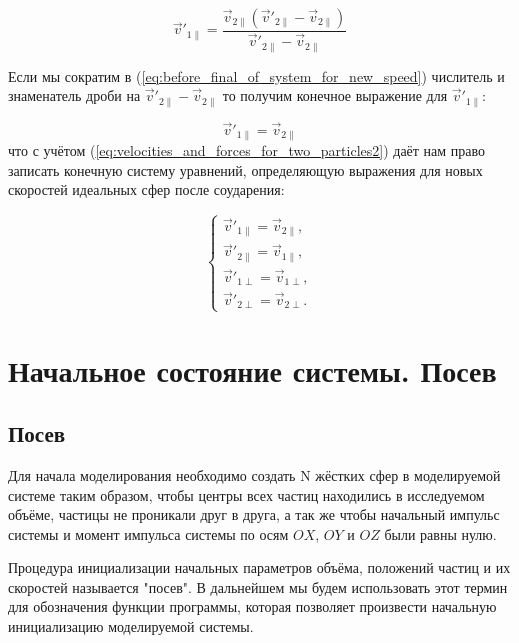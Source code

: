 \documentclass{article}
\begin{document}
\begin{equation}\label{eq:before_final_of_system_for_new_speed}
    \vec{v}'_{1\parallel} = \frac{\vec{v}_{2\parallel}( \vec{v}'_{2\parallel} - \vec{v}_{2\parallel})}{\vec{v}'_{2\parallel} - \vec{v}_{2\parallel}}
\end{equation}

Если мы сократим в (\ref{eq:before_final_of_system_for_new_speed}) числитель и знаменатель дроби на $ \vec{v}'_{2\parallel} - \vec{v}_{2\parallel} $ то получим конечное выражение для $ \vec{v}'_{1\parallel} $:

\begin{equation}\label{eq:final_of_system_for_new_speed}
    \vec{v}'_{1\parallel} = \vec{v}_{2\parallel}
\end{equation}
что с учётом (\ref{eq:velocities_and_forces_for_two_particles2}) даёт нам право записать конечную систему уравнений, определяющую выражения для новых скоростей идеальных сфер после соударения:

\begin{equation}\label{eq:result_for_new_speeds_after_collisions}
    \begin{cases}
        \vec{v}'_{1\parallel} = \vec{v}_{2\parallel},
        \\
        \vec{v}'_{2\parallel} = \vec{v}_{1\parallel},
        \\
        \vec{v}'_{1\perp} = \vec{v}_{1\perp},
        \\
        \vec{v}'_{2\perp} = \vec{v}_{2\perp}.
    \end{cases}
\end{equation}




\newpage
\section{Начальное состояние системы. Посев}

\subsection{Посев}

Для начала моделирования необходимо создать N жёстких сфер в моделируемой системе таким образом, чтобы центры всех частиц находились в исследуемом объёме, частицы не проникали друг в друга, а так же чтобы начальный импульс системы и момент импульса системы по осям $ OX $, $ OY $ и $ OZ $ были равны нулю.

Процедура инициализации начальных параметров объёма, положений частиц и их скоростей называется "посев". В дальнейшем мы будем использовать этот термин для обозначения функции программы, которая позволяет произвести начальную инициализацию моделируемой системы.
\end{document}
